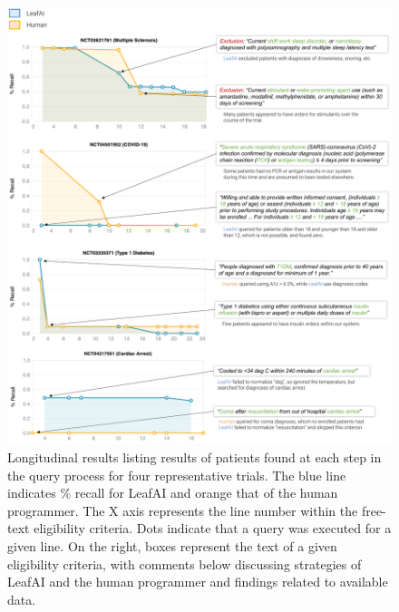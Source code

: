 \documentclass[../main.tex]{subfiles}
\begin{document}
\begin{figure}[H]
  \begin{center}
    \includegraphics[scale=0.51]{figures/leafai_paper2_analysis0.pdf}  
  \end{center}
  \caption{Longitudinal results listing results of patients found at each step in the query process for four representative trials. The blue line indicates \% recall for LeafAI and orange that of the human programmer. The X axis represents the line number within the free-text eligibility criteria. Dots indicate that a query was executed for a given line. On the right, boxes represent the text of a given eligibility criteria, with comments below discussing strategies of LeafAI and the human programmer and findings related to available data.}
  \label{fig_leafai_results_analysis}
\end{figure}
\end{document}
